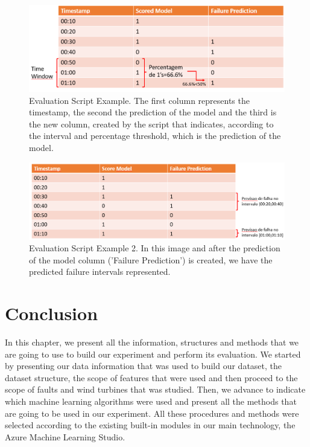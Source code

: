 \begin{figure}[htbp]
	\centering
	\includegraphics[scale=0.5]{Chapters/Figures/metric_example.png}
	\caption{Evaluation Script Example. The first column represents the timestamp, the second the prediction of the model and the third is the new column, created by the script that indicates, according to the interval and percentage threshold, which is the prediction of the model.}
	\label{fig:Figuras_Tree_silhouettes-vectorial}
\end{figure}

\begin{figure}[htbp]
	\centering
	\includegraphics[scale=0.5]{Chapters/Figures/metric_example2.png}
	\caption{Evaluation Script Example 2. In this image and after the prediction of the model column ('Failure Prediction') is created, we have the predicted failure intervals represented.}
	\label{fig:Figuras_Tree_silhouettes-vectorial}
\end{figure}


\section{Conclusion} 
\label{sub:if_you_use_this_template} 
In this chapter, we present all the information, structures and methods that we are going to use to build our experiment and perform its evaluation. We started by presenting our data information that was used to build our dataset, the dataset structure, the scope of features that were used and then proceed to the scope of faults and wind turbines that was studied. Then, we advance to indicate which machine learning algorithms were used and present all the methods that are going to be used in our experiment. All these procedures and methods were selected according to the existing built-in modules in our main technology, the Azure Machine Learning Studio.